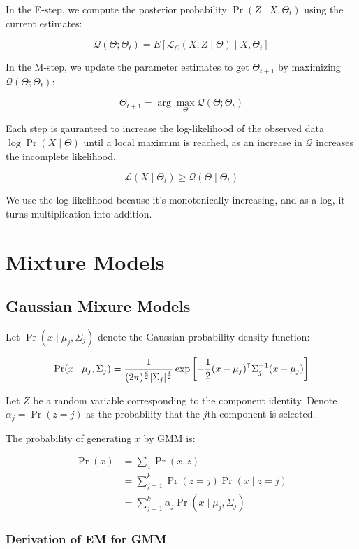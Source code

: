 \documentclass{idc_msc}
\renewcommand{\T}{{\mathpalette\raiseT\intercal}} %
\begin{document}
In the E-step, we compute the posterior probability \(\Pr(Z \mid X, \Theta_t)\) using the current estimates:

\[\mathcal{Q}(\Theta; \Theta_t) = E[\mathcal{L}_C(X, Z \mid \Theta)\mid X, \Theta_t]\]

In the M-step, we update the parameter estimates to get \(\Theta_{t + 1}\) by maximizing \(\mathcal{Q}(\Theta; \Theta_t)\):

\[\Theta_{t+1} = \arg \max_\Theta \mathcal{Q}(\Theta; \Theta_t)\]

Each step is gauranteed to increase the log-likelihood of the observed data \(\log \Pr(X \mid \Theta)\) until a local maximum is reached, as an increase in \(\mathcal{Q}\) increases the incomplete likelihood.

\[\mathcal{L}(X \mid \Theta_t) \ge \mathcal{Q}(\Theta \mid \Theta_t)\]

We use the log-likelihood because it's monotonically increasing, and as a log, it turns multiplication into addition.

\section{Mixture Models}

\subsection{Gaussian Mixure Models}

Let \(\Pr(x \mid \mu_j, \Sigma_j)\) denote the Gaussian probability density function:

\[\Pr(x \mid \mu_j, \Sigma_j) = \frac{1}{(2\pi)^\frac{d}{2}|\Sigma_j|^{\frac{1}{2}}} \exp\left[- \frac{1}{2}(x - \mu_j)^\T \Sigma_j^{-1}(x - \mu_j)\right]\]

Let \(Z\) be a random variable corresponding to the component identity.
Denote \(\alpha_j = \Pr(z = j)\) as the probability that the \(j\)th component is selected.

The probability of generating \(x\) by GMM is:

\[
\begin{aligned}
  \Pr(x) &= \sum_z \Pr(x, z) \\
  &= \sum_{j=1}^k \Pr(z = j) \Pr(x \mid z = j) \\
  &= \sum_{j=1}^k \alpha_j \Pr(x \mid \mu_j, \Sigma_j)
\end{aligned}
\]

\subsubsection{Derivation of EM for GMM}
\end{document}
